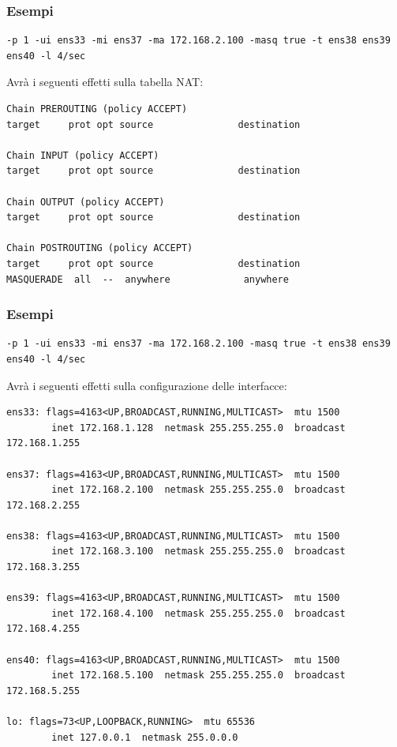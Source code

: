 \documentclass{beamer}
\begin{document}
\begin{frame}[fragile]
    \frametitle{Esempi}
    \begin{lstlisting}
-p 1 -ui ens33 -mi ens37 -ma 172.168.2.100 -masq true -t ens38 ens39 ens40 -l 4/sec
    \end{lstlisting}
    Avrà i seguenti effetti sulla tabella NAT:
    \begin{lstlisting}
Chain PREROUTING (policy ACCEPT)
target     prot opt source               destination         

Chain INPUT (policy ACCEPT)
target     prot opt source               destination         

Chain OUTPUT (policy ACCEPT)
target     prot opt source               destination         

Chain POSTROUTING (policy ACCEPT)
target     prot opt source               destination         
MASQUERADE  all  --  anywhere             anywhere 
    \end{lstlisting}
\end{frame}

\begin{frame}[fragile]
    \frametitle{Esempi}
    \begin{lstlisting}
-p 1 -ui ens33 -mi ens37 -ma 172.168.2.100 -masq true -t ens38 ens39 ens40 -l 4/sec
            \end{lstlisting}
    Avrà i seguenti effetti sulla configurazione delle interfacce:
    \begin{lstlisting}
ens33: flags=4163<UP,BROADCAST,RUNNING,MULTICAST>  mtu 1500
        inet 172.168.1.128  netmask 255.255.255.0  broadcast 172.168.1.255

ens37: flags=4163<UP,BROADCAST,RUNNING,MULTICAST>  mtu 1500
        inet 172.168.2.100  netmask 255.255.255.0  broadcast 172.168.2.255

ens38: flags=4163<UP,BROADCAST,RUNNING,MULTICAST>  mtu 1500
        inet 172.168.3.100  netmask 255.255.255.0  broadcast 172.168.3.255

ens39: flags=4163<UP,BROADCAST,RUNNING,MULTICAST>  mtu 1500
        inet 172.168.4.100  netmask 255.255.255.0  broadcast 172.168.4.255

ens40: flags=4163<UP,BROADCAST,RUNNING,MULTICAST>  mtu 1500
        inet 172.168.5.100  netmask 255.255.255.0  broadcast 172.168.5.255

lo: flags=73<UP,LOOPBACK,RUNNING>  mtu 65536
        inet 127.0.0.1  netmask 255.0.0.0
    \end{lstlisting}
\end{frame}
\end{document}
